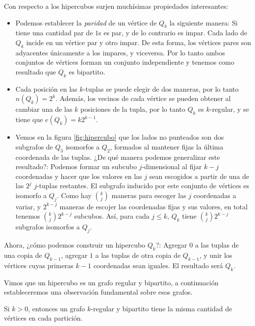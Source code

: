 \begin{prob}
    Con respecto a los hipercubos surjen muchísimas propiedades interesantes:
    
    \begin{itemize}
        \item Podemos establecer la \textit{paridad} de un vértice de $Q_k$ la siguiente manera: Si tiene una cantidad par de $1$s es par, y de lo contrario es impar. Cada lado de $Q_k$ incide en un vértice par y otro impar. De esta forma, los vértices pares son adyacentes únicamente a los impares, y viceversa. Por lo tanto ambos conjuntos de vértices forman un conjunto independiente y tenemos como resultado que $Q_k$ es bipartito.
        \item Cada posición en las $k$-tuplas se puede elegir de dos maneras, por lo tanto $n(Q_k) = 2^k$. Además, los vecinos de cada vértice se pueden obtener al cambiar una de las $k$ posiciones de la tupla, por lo tanto $Q_k$ es $k$-regular, y se tiene que $e(Q_k) = k2^{k-1}$.
        \item Vemos en la figura \ref{fig:hipercubo} que los lados no punteados son dos subgrafos de $Q_3$ isomorfos a $Q_2$, formados al mantener fijas la última coordenada de las tuplas. ¿De qué manera podemos generalizar este resultado?: Podemos formar un subcubo $j$-dimensional al fijar $k-j$ coordenadas y hacer que los valores en las $j$ sean escogidos a partir de una de las $2^j$ $j$-tuplas restantes. El subgrafo inducido por este conjunto de vértices es isomorfo a $Q_j$. Como hay $\binom{k}{j}$ maneras para escoger las $j$ coordenadas a variar, y $2^{k-j}$ maneras de escojer las coordenadas fijas y sus valores, en total tenemos $\binom{k}{j}2^{k-j}$ subcubos. Así, para cada $j \leq k$, $Q_k$ tiene $\binom{k}{j}2^{k-j}$ subgrafos isomorfos a $Q_j$.
    \end{itemize}
    
    Ahora, ¿cómo podemos construir un hipercubo $Q_k$?: Agregar $0$ a las tuplas de una copia de $Q_{k-1}$, agregar $1$ a las tuplas de otra copia de $Q_{k-1}$, y unir los vértices cuyas primeras $k-1$ coordenadas sean iguales. El resultado será $Q_k$.
\end{prob}

Vimos que un hipercubo es un grafo regular y bipartito, a continuación estableceremos una observación fundamental sobre esos grafos.

\begin{teo}
    Si $k > 0$, entonces un grafo $k$-regular y bipartito tiene la misma cantidad de vértices en cada partición.
\end{teo}

